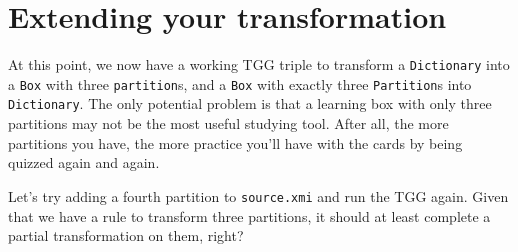 \newpage
\section{Extending your transformation}
\genHeader

At this point, we now have a working TGG triple to transform a \texttt{Dictionary} into a \texttt{Box} with three \texttt{partition}s, and a \texttt{Box} with
exactly three \texttt{Partition}s into \texttt{Dictionary}. The only potential problem is that a learning box with only three partitions may not be the most
useful studying tool. After all, the more partitions you have, the more practice you'll have with the cards by being quizzed again and again.

Let's try adding a fourth partition to \texttt{source.xmi} and run the TGG again. Given that we have a rule to transform three partitions, it should at least
complete a partial transformation on them, right? 

